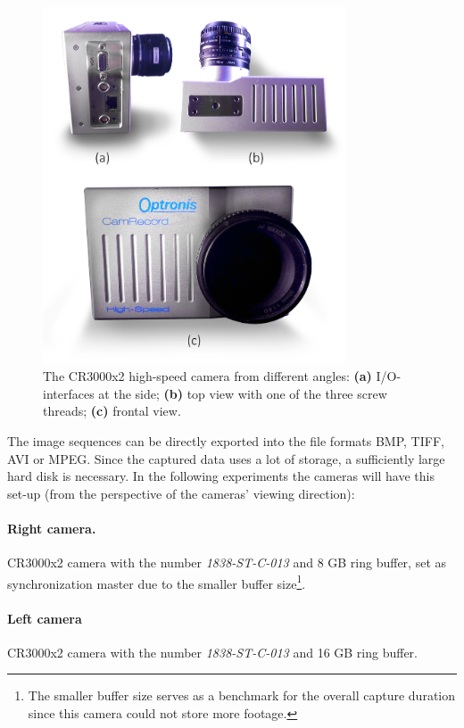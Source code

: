 \begin{figure}[htbp]
		\centering
		\includegraphics[width=0.8\textwidth]{figures/cameraSpecs}
		\caption[Camera from different angles]{The CR3000x2 high-speed camera from different angles: \textbf{(a)} I/O-interfaces at the side; \textbf{(b)} top view with one of the three screw threads; \textbf{(c)} frontal view.}
		\label{fig:camSpecs}
\end{figure}

The image sequences can be directly exported into the file formats BMP, TIFF, AVI or MPEG. Since the captured data uses a lot of storage, a sufficiently large hard disk is necessary.
In the following experiments the cameras will have this set-up (from the perspective of the cameras' viewing direction):

\paragraph{Right camera.}
CR3000x2 camera with the number \textit{1838-ST-C-013} and 8 GB ring buffer, set as synchronization master due to the smaller buffer size\footnote{The smaller buffer size serves as a benchmark for the overall capture duration since this camera could not store more footage.}.

\paragraph{Left camera}
CR3000x2 camera with the number \textit{1838-ST-C-013} and 16 GB ring buffer.

